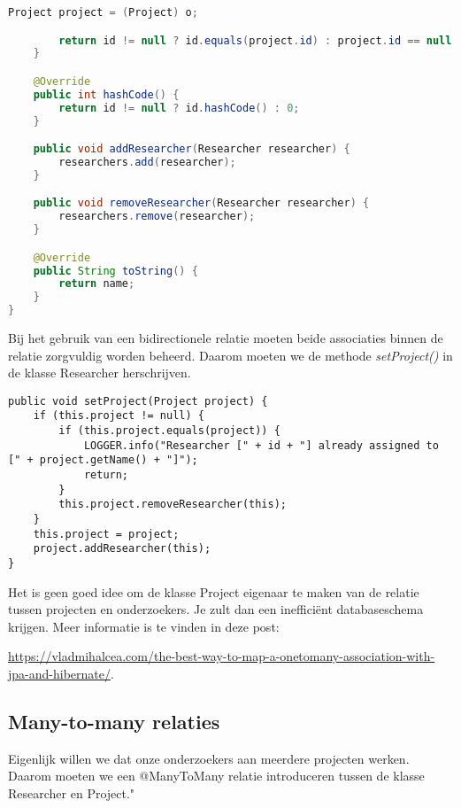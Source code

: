 \begin{lstlisting}[frame=single, language=java]
		Project project = (Project) o;

		return id != null ? id.equals(project.id) : project.id == null;
	}

	@Override
	public int hashCode() {
		return id != null ? id.hashCode() : 0;
	}

	public void addResearcher(Researcher researcher) {
		researchers.add(researcher);
	}

	public void removeResearcher(Researcher researcher) {
		researchers.remove(researcher);
	}

	@Override
	public String toString() {
		return name;
	}
}
\end{lstlisting}

Bij het gebruik van een bidirectionele relatie moeten beide associaties binnen de relatie zorgvuldig worden beheerd.
Daarom moeten we de methode \textit{setProject()} in de klasse Researcher herschrijven.

\begin{lstlisting}
public void setProject(Project project) {
	if (this.project != null) {
		if (this.project.equals(project)) {
			LOGGER.info("Researcher [" + id + "] already assigned to [" + project.getName() + "]");
			return;
		}
		this.project.removeResearcher(this);
	}
	this.project = project;
	project.addResearcher(this);
}
\end{lstlisting}
 
Het is geen goed idee om de klasse Project eigenaar te maken van de relatie tussen projecten en onderzoekers.  Je zult dan een inefficiënt databaseschema krijgen.  Meer informatie is te vinden in deze post:

\url{https://vladmihalcea.com/the-best-way-to-map-a-onetomany-association-with-jpa-and-hibernate/}.


\subsection{Many-to-many relaties}

Eigenlijk willen we dat onze onderzoekers aan meerdere projecten werken. Daarom moeten we een @ManyToMany relatie introduceren tussen de klasse Researcher en Project."

